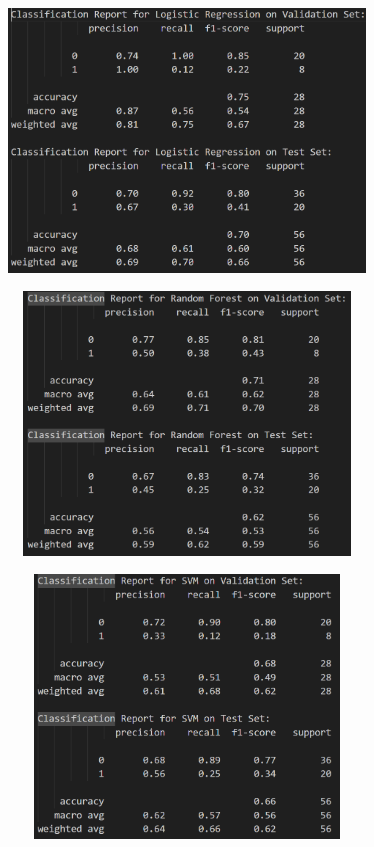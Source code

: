 \documentclass{ctexart}
\begin{document}
\begin{figure}[H]
	\centering 
	\includegraphics[height=7cm,width=10cm]{5.png}
	\end{figure}
	\begin{figure}[H]
		\centering 
		\includegraphics[height=7cm,width=10cm]{6.png}
		\end{figure}
		\begin{figure}[H]
			\centering 
			\includegraphics[height=7cm,width=10cm]{7.png}
			\end{figure}
\end{document}
